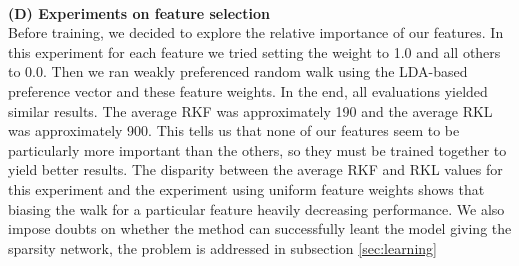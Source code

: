 \documentclass{article} %
\begin{document}
\\
\textbf{(D) Experiments on feature selection}\\
Before training, we decided to explore the relative importance of our features. In this experiment for each feature we tried setting the weight to 1.0 and all others to 0.0. Then we ran weakly preferenced random walk using the LDA-based preference vector and these feature weights. In the end, all evaluations yielded similar results. The average RKF was approximately 190 and the average RKL was approximately 900. This tells us that none of our features seem to be particularly more important than the others, so they must be trained together to yield better results. The disparity between the average RKF and RKL values for this experiment and the experiment using uniform feature weights shows that biasing the walk for a particular feature heavily decreasing performance. We also impose doubts on whether the method can successfully leant the model giving the sparsity network, the problem is addressed in subsection \ref{sec:learning}\\
%
\end{document}
